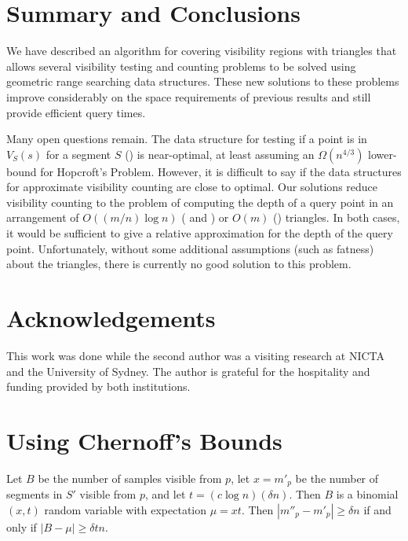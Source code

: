 \documentclass{patmorin}
\begin{document}
\section{Summary and Conclusions}

We have described an algorithm for covering visibility regions with
triangles that allows several visibility testing and counting problems
to be solved using geometric range searching data structures.  These new
solutions to these problems improve considerably on the space requirements
of previous results and still provide efficient query times.

Many open questions remain.  The data structure for testing if a point is
in $V_S(s)$ for a segment $S$ () is near-optimal,
at least assuming an $\Omega(n^{4/3})$ lower-bound for Hopcroft's
Problem.  However, it is difficult to say if the data structures for
approximate visibility counting are close to optimal.  Our solutions
reduce visibility counting to the problem of computing the depth of a
query point in an arrangement of $O((m/n)\log n)$ (
and ) or $O(m)$ () triangles.
In both cases, it would be sufficient to give a relative approximation
for the depth of the query point.  Unfortunately, without some additional
assumptions (such as fatness) about the triangles, there is currently
no good solution to this problem.

\section*{Acknowledgements}

This work was done while the second author was a visiting research at NICTA
and the University of Sydney.  The author is grateful for the hospitality
and funding provided by both institutions.





\appendix

\section{Using Chernoff's Bounds}

Let $B$ be the number of samples visible from $p$, let $x=m'_p$ be the
number of segments in $S'$ visible from $p$, and let $t=(c\log n)(\delta
n)$.  Then $B$ is a binomial$(x,t)$ random variable with expectation
$\mu = xt$.  Then $|m''_p-m'_p|\ge \delta n$ if and only if $|B-\mu|\ge
\delta t n$.  
\end{document}

